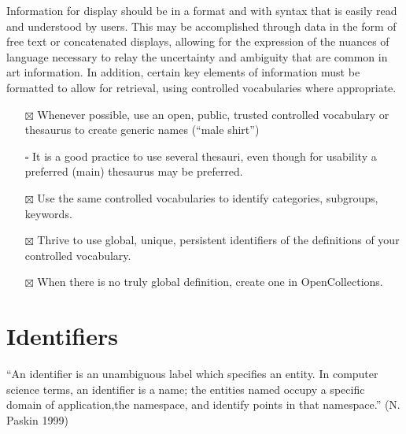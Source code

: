 \documentclass[
  letterpaper,
  DIV=11,
  numbers=noendperiod]{scrreprt}
\providecommand{\tightlist}{%
  \setlength{\itemsep}{0pt}\setlength{\parskip}{0pt}}\usepackage{longtable,booktabs,array}
\begin{document}
Information for display should be in a format and with syntax that is
easily read and understood by users. This may be accomplished through
data in the form of free text or concatenated displays, allowing for the
expression of the nuances of language necessary to relay the uncertainty
and ambiguity that are common in art information. In addition, certain
key elements of information must be formatted to allow for retrieval,
using controlled vocabularies where appropriate.

\begin{tcolorbox}[enhanced jigsaw, opacityback=0, bottomrule=.15mm, rightrule=.15mm, toptitle=1mm, breakable, colbacktitle=quarto-callout-tip-color!10!white, colback=white, title=\textcolor{quarto-callout-tip-color}{\faLightbulb}\hspace{0.5em}{Tips for naming things}, leftrule=.75mm, toprule=.15mm, left=2mm, arc=.35mm, colframe=quarto-callout-tip-color-frame, coltitle=black, titlerule=0mm, bottomtitle=1mm, opacitybacktitle=0.6]

\begin{itemize}
\tightlist
\item[$\boxtimes$]
  Whenever possible, use an open, public, trusted controlled vocabulary
  or thesaurus to create generic names (``male shirt'')
\item[$\square$]
  It is a good practice to use several thesauri, even though for
  usability a preferred (main) thesaurus may be preferred.
\item[$\boxtimes$]
  Use the same controlled vocabularies to identify categories,
  subgroups, keywords.
\item[$\boxtimes$]
  Thrive to use global, unique, persistent identifiers of the
  definitions of your controlled vocabulary.
\item[$\boxtimes$]
  When there is no truly global definition, create one in
  OpenCollections.
\end{itemize}

\end{tcolorbox}

\section{Identifiers}\label{identifiers}

``An identifier is an unambiguous label which specifies an entity. In
computer science terms, an identifier is a name; the entities named
occupy a specific domain of application,the namespace, and identify
points in that namespace.'' (N. Paskin 1999)
\end{document}

